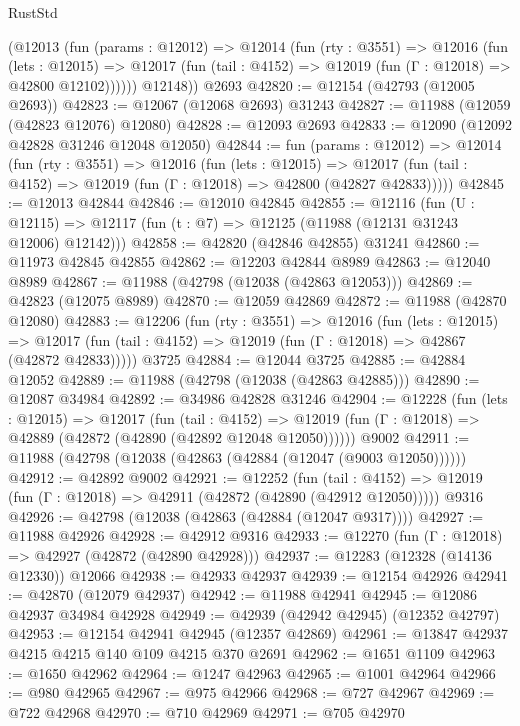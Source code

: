 \begin{lexlean}{RustStd}
\begin{coremodule}
        (@12013
          (fun (params : @12012) =>
          @12014
            (fun (rty : @3551) =>
            @12016
              (fun (lets : @12015) =>
              @12017 (fun (tail : @4152) => @12019 (fun (Γ : @12018) => @42800 @12102))))))
        @12148))
    @2693
@42820 := @12154 (@42793 (@12005 @2693))
@42823 := @12067 (@12068 @2693) @31243
@42827 := @11988 (@12059 (@42823 @12076) @12080)
@42828 := @12093 @2693
@42833 := @12090 (@12092 @42828 @31246 @12048 @12050)
@42844 := fun (params : @12012) =>
  @12014
    (fun (rty : @3551) =>
    @12016
      (fun (lets : @12015) =>
      @12017 (fun (tail : @4152) => @12019 (fun (Γ : @12018) => @42800 (@42827 @42833)))))
@42845 := @12013 @42844
@42846 := @12010 @42845
@42855 := @12116
    (fun (U : @12115) => @12117 (fun (t : @7) => @12125 (@11988 (@12131 @31243 @12006) @12142)))
@42858 := @42820 (@42846 @42855) @31241
@42860 := @11973 @42845 @42855
@42862 := @12203 @42844 @8989
@42863 := @12040 @8989
@42867 := @11988 (@42798 (@12038 (@42863 @12053)))
@42869 := @42823 (@12075 @8989)
@42870 := @12059 @42869
@42872 := @11988 (@42870 @12080)
@42883 := @12206
    (fun (rty : @3551) =>
    @12016
      (fun (lets : @12015) =>
      @12017 (fun (tail : @4152) => @12019 (fun (Γ : @12018) => @42867 (@42872 @42833)))))
    @3725
@42884 := @12044 @3725
@42885 := @42884 @12052
@42889 := @11988 (@42798 (@12038 (@42863 @42885)))
@42890 := @12087 @34984
@42892 := @34986 @42828 @31246
@42904 := @12228
    (fun (lets : @12015) =>
    @12017
      (fun (tail : @4152) =>
      @12019 (fun (Γ : @12018) => @42889 (@42872 (@42890 (@42892 @12048 @12050))))))
    @9002
@42911 := @11988 (@42798 (@12038 (@42863 (@42884 (@12047 (@9003 @12050))))))
@42912 := @42892 @9002
@42921 := @12252
    (fun (tail : @4152) => @12019 (fun (Γ : @12018) => @42911 (@42872 (@42890 (@42912 @12050)))))
    @9316
@42926 := @42798 (@12038 (@42863 (@42884 (@12047 @9317))))
@42927 := @11988 @42926
@42928 := @42912 @9316
@42933 := @12270 (fun (Γ : @12018) => @42927 (@42872 (@42890 @42928)))
@42937 := @12283 (@12328 (@14136 @12330)) @12066
@42938 := @42933 @42937
@42939 := @12154 @42926
@42941 := @42870 (@12079 @42937)
@42942 := @11988 @42941
@42945 := @12086 @42937 @34984 @42928
@42949 := @42939 (@42942 @42945) (@12352 @42797)
@42953 := @12154 @42941 @42945 (@12357 @42869)
@42961 := @13847 @42937 @4215 @4215 @140 @109 @4215 @370 @2691
@42962 := @1651 @1109
@42963 := @1650 @42962
@42964 := @1247 @42963
@42965 := @1001 @42964
@42966 := @980 @42965
@42967 := @975 @42966
@42968 := @727 @42967
@42969 := @722 @42968
@42970 := @710 @42969
@42971 := @705 @42970

\end{coremodule}
\end{lexlean}
